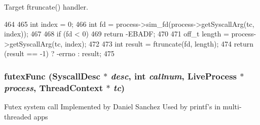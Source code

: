 Target ftruncate() handler. 


\begin{DoxyCode}
464 {
465     int index = 0;
466     int fd = process->sim_fd(process->getSyscallArg(tc, index));
467 
468     if (fd < 0)
469         return -EBADF;
470 
471     off_t length = process->getSyscallArg(tc, index);
472 
473     int result = ftruncate(fd, length);
474     return (result == -1) ? -errno : result;
475 }
\end{DoxyCode}
\hypertarget{syscall__emul_8hh_a0076008fee4a9a049d0ee73b42bd0802}{
\subsubsection[{futexFunc}]{ futexFunc ({\bf SyscallDesc} $\ast$ {\em desc}, \/  int {\em callnum}, \/  {\bf LiveProcess} $\ast$ {\em process}, \/  {\bf ThreadContext} $\ast$ {\em tc})}}
\label{syscall__emul_8hh_a0076008fee4a9a049d0ee73b42bd0802}
Futex system call Implemented by Daniel Sanchez Used by printf's in multi-\/threaded apps 


